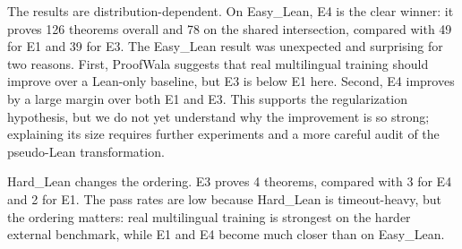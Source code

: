 \documentclass{article} %
\begin{document}
\begin{table}[H]
\centering
\caption{Proof-search results on Easy\_Lean and Hard\_Lean.  Pass rate is proved / attempted.}
\label{tab:main-results}
\end{table}

The results are distribution-dependent.  On Easy\_Lean, E4 is the clear winner: it proves 126 theorems overall and 78 on the shared intersection, compared with 49 for E1 and 39 for E3.  The Easy\_Lean result was unexpected and surprising for two reasons.  First, ProofWala suggests that real multilingual training should improve over a Lean-only baseline, but E3 is below E1 here.  Second, E4 improves by a large margin over both E1 and E3.  This supports the regularization hypothesis, but we do not yet understand why the improvement is so strong; explaining its size requires further experiments and a more careful audit of the pseudo-Lean transformation.

Hard\_Lean changes the ordering.  E3 proves 4 theorems, compared with 3 for E4 and 2 for E1.  The pass rates are low because Hard\_Lean is timeout-heavy, but the ordering matters: real multilingual training is strongest on the harder external benchmark, while E1 and E4 become much closer than on Easy\_Lean.
\end{document}

